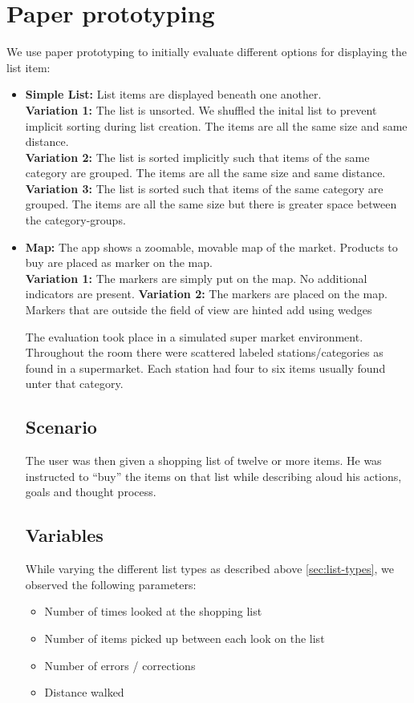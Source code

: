 \documentclass{article}
\begin{document}
\section{Paper prototyping}
We use paper prototyping to initially evaluate different options for displaying the list item:

\label{sec:list-types}
\begin{itemize}
    \item \textbf{Simple List:} List items are displayed beneath one another.\\
        \textbf{Variation 1:} The list is unsorted. We shuffled the inital list to prevent implicit sorting during list creation.
            The items are all the same size and same distance. \\
        \textbf{Variation 2:} The list is sorted implicitly such that items of the same category are grouped.
            The items are all the same size and same distance. \\
        \textbf{Variation 3:} The list is sorted such that items of the same category are grouped.
            The items are all the same size but there is greater space between the category-groups.
    \item \textbf{Map:} The app shows a zoomable, movable map of the market. Products to buy are placed as marker on the map. \\
        \textbf{Variation 1:} The markers are simply put on the map. No additional indicators are present.
        \textbf{Variation 2:} The markers are placed on the map. Markers that are outside the field of view are hinted add using wedges \cite{TODO}
\begin{itemize}


The evaluation took place in a simulated super market environment. 
Throughout the room there were scattered labeled stations/categories as found in a supermarket.
Each station had four to six items usually found unter that category.

\subsection{Scenario}
The user was then given a shopping list of twelve or more items. 
He was instructed to ``buy'' the items on that list while describing aloud his actions, goals and thought process.

\subsection{Variables}
While varying the different list types as described above \ref{sec:list-types}, we observed the following parameters:
\begin{itemize}
    \item Number of times looked at the shopping list
    \item Number of items picked up between each look on the list
    \item Number of errors / corrections
    \item Distance walked
\end{itemize}


\end{itemize}
\end{itemize}
\end{document}

